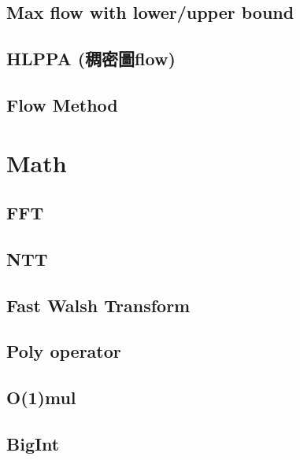 \documentclass[a4paper,10pt,twocolumn,oneside]{article}
\begin{document}
\subsection{Max flow with lower/upper bound}


% 

\subsection{HLPPA (稠密圖flow)}


\subsection{Flow Method}


\section{Math}
\subsection{FFT}


\subsection{NTT}


\subsection{Fast Walsh Transform}


\subsection{Poly operator}


\subsection{O(1)mul}


\subsection{BigInt}

\end{document}
